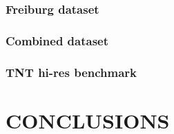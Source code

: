 \documentclass{article}
\begin{document}
\subsubsection{Freiburg dataset}
\label{sssec:freiburg}
\subsubsection{Combined dataset}
\label{sssec:combined}
\subsubsection{TNT hi-res benchmark}
\label{sssec:tnt}

\section{CONCLUSIONS}
\label{sec:concl}










\end{document}
